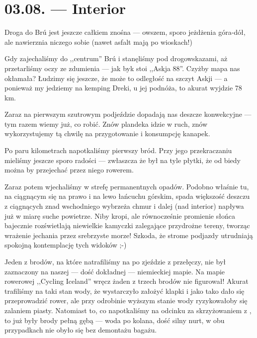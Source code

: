 \chapter*{03.08. --- Interior}

Droga do Brú jest jeszcze całkiem znośna --- owszem, sporo jeżdżenia góra-dół, ale nawierznia niczego sobie (nawet asfalt mają po wioskach!)

Gdy zajechaliśmy do ,,centrum'' Brú i stanęliśmy pod drogowskazami, aż przetarliśmy oczy ze zdumienia --- jak byk stoi ,,Askja 88''. Czyżby mapa nas okłamała? Łudzimy się jeszcze, że może to odległość na szczyt Askji --- a ponieważ my jedziemy na kemping Dreki, u jej podnóża, to akurat wyjdzie 78 km.

Zaraz na pierwszym szutrowym podjeździe dopadają nas deszcze konwekcyjne --- tym razem wiemy już, co robić. Znów plandeka idzie w ruch, znów wykorzystujemy tą chwilę na przygotowanie i konsumpcję kanapek.

Po paru kilometrach napotkaliśmy pierwszy bród. Przy jego przekraczaniu mieliśmy jeszcze sporo radości --- zwłaszcza że był na tyle płytki, że od biedy można by przejechać przez niego rowerem.

Zaraz potem wjechaliśmy w strefę permanentnych opadów. Podobno właśnie tu, na ciągnącym się na prawo i na lewo łańcuchu górskim, spada większość deszczu z ciągnących znad wschodniego wybrzeża chmur i dalej (nad interior) napływa już w miarę suche powietrze. Niby kropi, ale równocześnie promienie słońca bajecznie rozświetlają niewielkie kamyczki zalegające przydrożne tereny, tworząc wrażenie jechania przez srebrzyste morze! Szkoda, że strome podjazdy utrudniają spokojną kontemplację tych widoków ;-)


Jeden z brodów, na które natrafiliśmy na  po zjeździe z przełęczy, nie był zaznaczony na naszej --- dość dokładnej --- niemieckiej mapie. Na mapie rowerowej ,,Cycling Iceland'' wręcz żaden z trzech brodów nie figurował! Akurat trafiliśmy na taki stan wody, że wystarczyło założyć klapki i jako tako dało się przeprowadzić rower, ale przy odrobinie wyższym stanie wody ryzykowałoby się zalaniem piasty. Natomiast to, co napotkaliśmy na odcinku za skrzyżowaniem z , to już były brody pełną gębą --- woda po kolana, dość silny nurt, w obu przypadkach nie obyło się bez demontażu bagażu.


